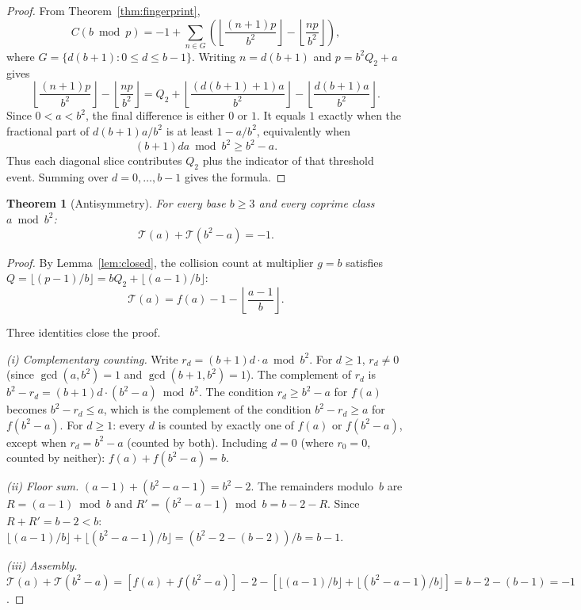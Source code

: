 \documentclass[12pt]{amsart}
\newtheorem{theorem}{Theorem}
\theoremstyle{definition}
\theoremstyle{remark}
\begin{document}
\begin{proof}
From Theorem~\ref{thm:fingerprint},
\[
C(b \bmod p)
= -1 + \sum_{n \in G}
\left(
\left\lfloor \frac{(n+1)p}{b^2}\right\rfloor
- \left\lfloor \frac{np}{b^2}\right\rfloor
\right),
\]
where $G=\{d(b+1):0\le d\le b-1\}$. Writing
$n=d(b+1)$ and $p=b^2Q_2+a$ gives
\[
\left\lfloor \frac{(n+1)p}{b^2}\right\rfloor
- \left\lfloor \frac{np}{b^2}\right\rfloor
= Q_2 +
\left\lfloor \frac{(d(b+1)+1)a}{b^2}\right\rfloor
- \left\lfloor \frac{d(b+1)a}{b^2}\right\rfloor.
\]
Since $0<a<b^2$, the final difference is either $0$ or $1$.
It equals $1$ exactly when the fractional part of
$d(b+1)a/b^2$ is at least $1-a/b^2$, equivalently when
\[
(b+1)da \bmod b^2 \ge b^2-a.
\]
Thus each diagonal slice contributes $Q_2$ plus the
indicator of that threshold event. Summing over
$d=0,\dots,b-1$ gives the formula.
\end{proof}

\begin{theorem}[Antisymmetry]\label{thm:antisym}
For every base $b \ge 3$ and every coprime class
$a \bmod b^2$:
\[
\mathcal{T}(a) + \mathcal{T}(b^2 - a) = -1.
\]
\end{theorem}

\begin{proof}
By Lemma~\ref{lem:closed},
the collision count at multiplier $g=b$ satisfies
$Q = \lfloor (p{-}1)/b \rfloor = b Q_2 +
\lfloor (a{-}1)/b \rfloor$:
\[
\mathcal{T}(a) = f(a) - 1 - \left\lfloor
\frac{a-1}{b} \right\rfloor.
\]

Three identities close the proof.

\medskip\noindent
\emph{(i) Complementary counting.}
Write $r_d = (b{+}1) d \cdot a \bmod b^2$. For $d \ge 1$,
$r_d \ne 0$ (since $\gcd(a, b^2) = 1$ and
$\gcd(b{+}1, b^2) = 1$). The complement of $r_d$ is
$b^2 - r_d = (b{+}1) d \cdot (b^2{-}a) \bmod b^2$.
The condition $r_d \ge b^2 - a$ for $f(a)$ becomes
$b^2 - r_d \le a$, which is the complement of the
condition $b^2 - r_d \ge a$ for $f(b^2{-}a)$.
For $d \ge 1$: every $d$ is counted by exactly one of
$f(a)$ or $f(b^2{-}a)$, except when $r_d = b^2 - a$
(counted by both). Including $d = 0$ (where
$r_0 = 0$, counted by neither):
$f(a) + f(b^2{-}a) = b$.

\medskip\noindent
\emph{(ii) Floor sum.}
$(a{-}1) + (b^2{-}a{-}1) = b^2 - 2$. The remainders
modulo~$b$ are $R = (a{-}1) \bmod b$ and
$R' = (b^2{-}a{-}1) \bmod b = b{-}2{-}R$. Since
$R + R' = b - 2 < b$:
$\lfloor (a{-}1)/b \rfloor +
\lfloor (b^2{-}a{-}1)/b \rfloor = (b^2 - 2 - (b-2))/b
= b - 1$.

\medskip\noindent
\emph{(iii) Assembly.}
$\mathcal{T}(a) + \mathcal{T}(b^2{-}a) =
[f(a) + f(b^2{-}a)] - 2 -
[\lfloor(a{-}1)/b\rfloor + \lfloor(b^2{-}a{-}1)/b\rfloor]
= b - 2 - (b - 1) = -1$.
\end{proof}
\end{document}
